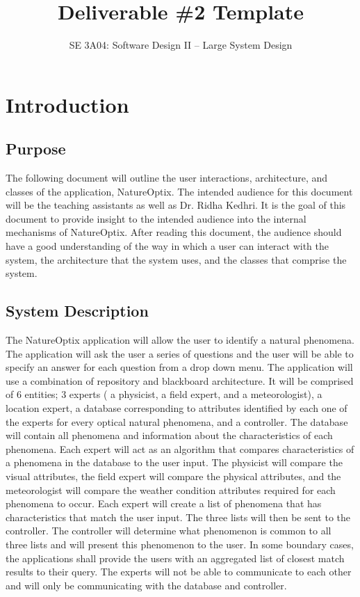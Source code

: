 \documentclass[]{article}
\title{Deliverable \#2 Template}
\author{SE 3A04: Software Design II -- Large System Design}
\date{}
\begin{document}
\maketitle	

\section{Introduction}
\label{sec:introduction}



\subsection{Purpose}
\label{sub:purpose}
The following document will outline the user interactions, architecture, and classes of the application, NatureOptix.  The intended audience for this document will be the teaching assistants as well as Dr. Ridha Kedhri. It is the goal of this document to provide insight to the intended audience into the internal mechanisms of NatureOptix. After reading this document, the audience should have a good understanding of the way in which a user can interact with the system, the architecture that the system uses, and the classes that comprise the system. 

\subsection{System Description}
\label{sub:system_description}
The NatureOptix application will allow the user to identify a natural phenomena. The application will ask the user a series of questions and the user will be able to specify an answer for each question from a drop down menu. The application will use a combination of repository and blackboard architecture. It will be comprised of 6 entities; 3 experts ( a physicist, a field expert, and a meteorologist), a location expert, a database corresponding to attributes identified by each one of the experts for every optical natural phenomena, and a controller. The database will contain all phenomena and information about the characteristics of each phenomena. Each expert will act as an algorithm that compares characteristics of a phenomena in the database to the user input. The physicist will compare the visual attributes, the field expert will compare the physical attributes, and the meteorologist will compare the weather condition attributes required for each phenomena to occur. Each expert will create a list of phenomena that has characteristics that match the user input. The three lists will then be sent to the controller. The controller will determine what phenomenon is common to all three lists and will present this phenomenon to the user. In some boundary cases, the applications shall provide the users with an aggregated list of closest match results to their query. The experts will not be able to communicate to each other and will only be communicating with the database and controller. 
\end{document}
